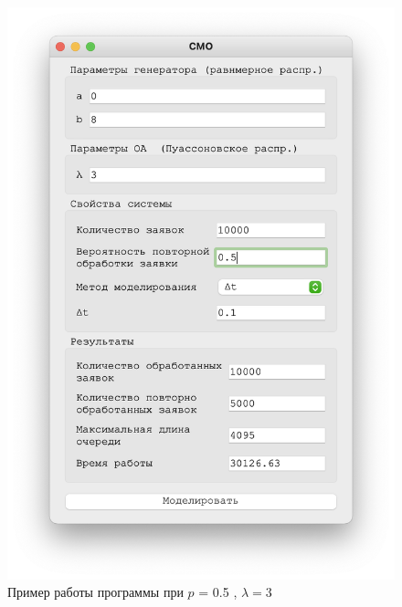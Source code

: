 \begin{figure}[!htb]
\begin{minipage}{0.55\textwidth}
      \includegraphics[width=1\linewidth]{3-50-t}
    \end{minipage}
    \caption{Пример работы программы при $p$ = 0.5 , $\lambda = 3$}
 \end{figure}

